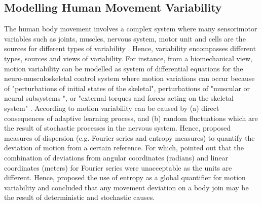 \subsection{Modelling Human Movement Variability}
The human body movement involves a complex system where many sensorimotor 
variables such as joints, muscles, nervous system, motor unit and cells are the sources 
for different types of variability \citep{newell1993}.
Hence, variability encompasses different types, sources and views of variability.
For instance, from a biomechanical view, motion variability can be modelled
as system of differential equations for the neuro-musculoskeletal 
control system where motion variations can occur because of 
"perturbations of initial states of the skeletal",
perturbations of "muscular or neural subsystems ",
or "external torques and forces acting on the skeletal system" 
\citep[p. 13]{hatze1986}.
According to \cite{hatze1986} motion variability can be caused by 
(a) direct consequences of adaptive learning process, and 
(b) random fluctuations which are the result of stochastic processes in the
nervous system.
Hence, \cite{hatze1986} proposed measures of dispersion (e.g. Fourier series and 
entropy measures) to quantify the deviation of motion from a certain reference.
For which, \cite{hatze1986} pointed out that the combination 
of deviations from angular coordinates (radians) and linear coordinates (meters)
for Fourier series were unacceptable as the units are different.
Hence, \cite{hatze1986} proposed the use of entropy as a global quantifier 
for motion variability and concluded that any movement deviation on a body join 
may be the result of deterministic and stochastic causes.





